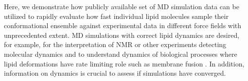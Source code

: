 \documentclass[journal=jpcbfk,manuscript=article,layout=twocolumn]{achemso}
\begin{document}
Here, we demonstrate how publicly available set of MD simulation data can be utilized to
rapidly evaluate how fast individual lipid molecules sample their conformational ensemble
against experimental data in different force fields with unprecedented extent. 
MD simulations with correct lipid dynamics are desired, for example, for the interpretation of
NMR or other experiments detecting molecular dynamics and to understand dynamics of biological processes where
lipid deformations have rate limiting role such as membrane fusion \cite{??}.
In addition, 
information on dynamics is crucial to assess if simulations have converged.%
%

\end{document}
